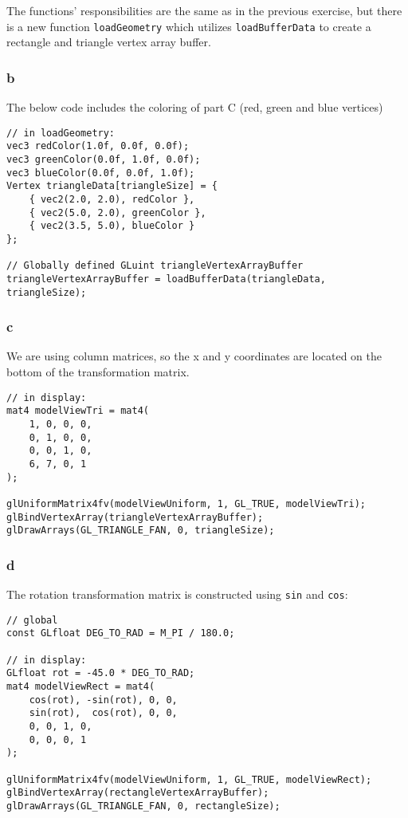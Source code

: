 The functions' responsibilities are the same as in the previous exercise, but there is a new function \texttt{loadGeometry} which utilizes \texttt{loadBufferData} to create a rectangle and triangle vertex array buffer.

\subsubsection{b}
The below code includes the coloring of part C (red, green and blue vertices)
\begin{lstlisting}
// in loadGeometry:
vec3 redColor(1.0f, 0.0f, 0.0f);
vec3 greenColor(0.0f, 1.0f, 0.0f);
vec3 blueColor(0.0f, 0.0f, 1.0f);
Vertex triangleData[triangleSize] = {
	{ vec2(2.0, 2.0), redColor },
	{ vec2(5.0, 2.0), greenColor },
	{ vec2(3.5, 5.0), blueColor }
};

// Globally defined GLuint triangleVertexArrayBuffer
triangleVertexArrayBuffer = loadBufferData(triangleData, triangleSize);
\end{lstlisting}

\subsubsection{c}
We are using column matrices, so the x and y coordinates are located on the bottom of the transformation matrix.

\begin{lstlisting}
// in display:
mat4 modelViewTri = mat4(
    1, 0, 0, 0,
	0, 1, 0, 0,
	0, 0, 1, 0,
	6, 7, 0, 1
);

glUniformMatrix4fv(modelViewUniform, 1, GL_TRUE, modelViewTri);
glBindVertexArray(triangleVertexArrayBuffer);
glDrawArrays(GL_TRIANGLE_FAN, 0, triangleSize);
\end{lstlisting}

\subsubsection{d}
The rotation transformation matrix is constructed using \texttt{sin} and \texttt{cos}:

\begin{lstlisting}
// global
const GLfloat DEG_TO_RAD = M_PI / 180.0;

// in display:
GLfloat rot = -45.0 * DEG_TO_RAD;
mat4 modelViewRect = mat4(
    cos(rot), -sin(rot), 0, 0,
    sin(rot),  cos(rot), 0, 0,
    0, 0, 1, 0,
    0, 0, 0, 1
);

glUniformMatrix4fv(modelViewUniform, 1, GL_TRUE, modelViewRect);
glBindVertexArray(rectangleVertexArrayBuffer);
glDrawArrays(GL_TRIANGLE_FAN, 0, rectangleSize);
\end{lstlisting}

